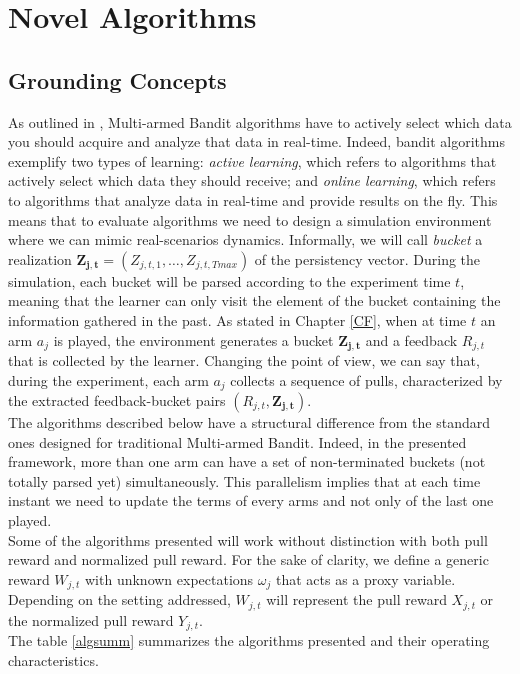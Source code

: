 \chapter{Novel Algorithms}\label{C10}



\section{Grounding Concepts}

As outlined in \cite{banditalgowebopt}, Multi-armed Bandit algorithms have to actively select which data you should acquire and analyze that data in real-time. Indeed, bandit algorithms exemplify two types of learning: \emph{active learning}, which refers to algorithms that actively select which data they should receive; and \emph{online learning}, which refers to algorithms that analyze data in real-time and provide results on the fly. This means that to evaluate algorithms we need to design a simulation environment where we can mimic real-scenarios dynamics. Informally, we will call \emph{bucket} a realization $\boldsymbol{Z_{j,t}}= (Z_{j,t,1},\dots, Z_{j,t,Tmax})$ of the persistency vector. During the simulation, each bucket will be parsed according to the experiment time $t$, meaning that the learner can only visit the element of the bucket containing the information gathered in the past. As stated in Chapter \ref{CF}, when at time $t$ an arm $a_j$ is played, the environment generates a bucket $\boldsymbol{Z_{j,t}}$ and a feedback $R_{j,t}$ that is collected by the learner.
Changing the point of view, we can say that, during the experiment, each arm $a_j$ collects a sequence of pulls, characterized by the extracted feedback-bucket pairs $(R_ {j, t}, \boldsymbol{Z_ {j, t}})$. 
\\The algorithms described below have a structural difference from the standard ones designed for traditional Multi-armed Bandit. Indeed, in the presented framework, more than one arm can have a set of non-terminated buckets (not totally parsed yet) simultaneously.  This parallelism implies that at each time instant we need to update the terms of every arms and not only of the last one played. \\Some of the algorithms presented will work without distinction with both pull reward and normalized pull reward.  For the sake of clarity, we define a generic reward $W_{j,t}$ with unknown expectations $\omega_j$ that acts as a proxy variable. Depending on the setting addressed, $W_{j,t}$ will represent the pull reward $X_{j,t}$ or the normalized pull reward $Y_{j,t}$.\\ The table \ref{algsumm} summarizes the algorithms presented and their operating characteristics.


